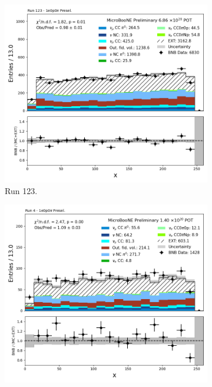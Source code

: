 \begin{figure}[H]
    \centering
    \begin{subfigure}[t]{0.32\linewidth}
        \includegraphics[width=\linewidth]{technote/Appendix_Preselection/Figures/1e0p0pi/Run123/reco_nu_vtx_x_Run123_1e0p0pi_Presel.png}
        \caption{Run 123.}
    \end{subfigure}%
    \hspace{0.2cm}%
    \begin{subfigure}[t]{0.32\linewidth}
        \includegraphics[width=\linewidth]{technote/Appendix_Preselection/Figures/1e0p0pi/Run4b/reco_nu_vtx_x_Run4b_1e0p0pi_Presel.png}

\end{subfigure}
\end{figure}
